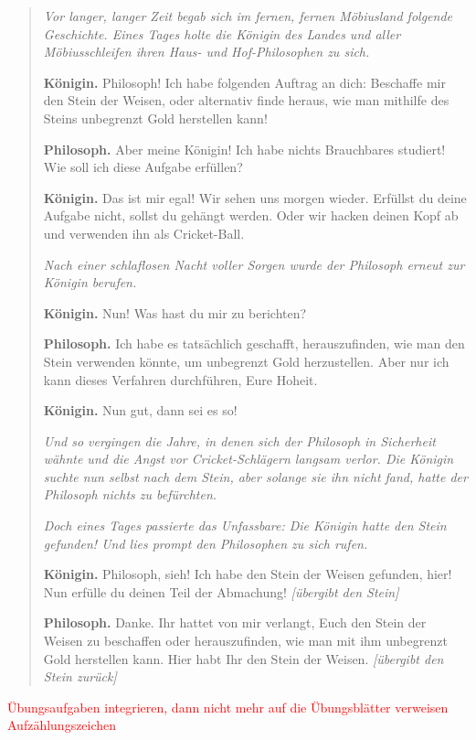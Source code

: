 \documentclass[a4paper,ngerman,12pt]{scrartcl}
\theoremstyle{definition}
\theoremstyle{plain}
\theoremstyle{remark}
\renewcommand{\_}{\mathpunct{.}\,}
\newcommand{\?}{\,{:}\,}
\newcommand{\XXX}[1]{\textcolor{red}{#1}}
\begin{document}
\begin{quote}
\emph{Vor langer, langer Zeit begab sich im fernen, fernen Möbiusland folgende
Geschichte. Eines Tages holte die Königin des Landes und aller Möbiusschleifen
ihren Haus- und Hof-Philosophen zu sich.}

\textbf{Königin.}
Philosoph! Ich habe folgenden Auftrag an dich: Beschaffe mir den Stein der
Weisen, oder alternativ finde heraus, wie man mithilfe des Steins unbegrenzt
Gold herstellen kann!

\textbf{Philosoph.}
Aber meine Königin! Ich habe nichts Brauchbares studiert! Wie soll ich diese
Aufgabe erfüllen?

\textbf{Königin.}
Das ist mir egal! Wir sehen uns morgen wieder. Erfüllst du deine Aufgabe nicht,
sollst du gehängt werden. Oder wir hacken deinen Kopf ab und verwenden ihn als
Cricket-Ball.

\emph{Nach einer schlaflosen Nacht voller Sorgen wurde der Philosoph erneut zur
Königin berufen.}

\textbf{Königin.}
Nun! Was hast du mir zu berichten?

\textbf{Philosoph.}
Ich habe es tatsächlich geschafft, herauszufinden, wie man den Stein verwenden
könnte, um unbegrenzt Gold herzustellen. Aber nur ich kann dieses Verfahren
durchführen, Eure Hoheit.

\textbf{Königin.}
Nun gut, dann sei es so!

\emph{Und so vergingen die Jahre, in denen sich der Philosoph in Sicherheit wähnte
und die Angst vor Cricket-Schlägern langsam verlor. Die Königin suchte nun
selbst nach dem Stein, aber solange sie ihn nicht fand, hatte der Philosoph
nichts zu befürchten.}

\emph{Doch eines Tages passierte das Unfassbare: Die Königin hatte den Stein
gefunden! Und lies prompt den Philosophen zu sich rufen.}

\textbf{Königin.}
Philosoph, sieh! Ich habe den Stein der Weisen gefunden, hier! Nun erfülle du
deinen Teil der Abmachung! \emph{[übergibt den Stein]}

\textbf{Philosoph.}
Danke. Ihr hattet von mir verlangt, Euch den Stein der Weisen zu beschaffen
oder herauszufinden, wie man mit ihm unbegrenzt Gold herstellen kann. Hier habt
Ihr den Stein der Weisen. \emph{[übergibt den Stein zurück]}
\end{quote}

\tableofcontents

\XXX{Übungsaufgaben integrieren, dann nicht mehr auf die Übungsblätter
verweisen}
\XXX{Aufzählungszeichen}
\end{document}

